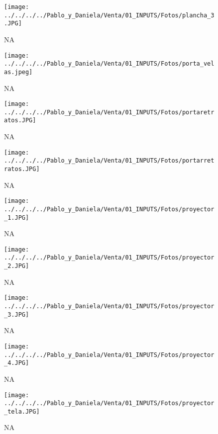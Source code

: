 \documentclass[
]{article}
\begin{document}
\pagebreak

\begin{figure}
\centering
\texttt{[image: ../../../../Pablo\_y\_Daniela/Venta/01\_INPUTS/Fotos/plancha\_3.JPG]}
\caption{NA}
\end{figure}

\pagebreak

\begin{figure}
\centering
\texttt{[image: ../../../../Pablo\_y\_Daniela/Venta/01\_INPUTS/Fotos/porta\_velas.jpeg]}
\caption{NA}
\end{figure}

\pagebreak

\begin{figure}
\centering
\texttt{[image: ../../../../Pablo\_y\_Daniela/Venta/01\_INPUTS/Fotos/portaretratos.JPG]}
\caption{NA}
\end{figure}

\pagebreak

\begin{figure}
\centering
\texttt{[image: ../../../../Pablo\_y\_Daniela/Venta/01\_INPUTS/Fotos/portarretratos.JPG]}
\caption{NA}
\end{figure}

\pagebreak

\begin{figure}
\centering
\texttt{[image: ../../../../Pablo\_y\_Daniela/Venta/01\_INPUTS/Fotos/proyector\_1.JPG]}
\caption{NA}
\end{figure}

\pagebreak

\begin{figure}
\centering
\texttt{[image: ../../../../Pablo\_y\_Daniela/Venta/01\_INPUTS/Fotos/proyector\_2.JPG]}
\caption{NA}
\end{figure}

\pagebreak

\begin{figure}
\centering
\texttt{[image: ../../../../Pablo\_y\_Daniela/Venta/01\_INPUTS/Fotos/proyector\_3.JPG]}
\caption{NA}
\end{figure}

\pagebreak

\begin{figure}
\centering
\texttt{[image: ../../../../Pablo\_y\_Daniela/Venta/01\_INPUTS/Fotos/proyector\_4.JPG]}
\caption{NA}
\end{figure}

\pagebreak

\begin{figure}
\centering
\texttt{[image: ../../../../Pablo\_y\_Daniela/Venta/01\_INPUTS/Fotos/proyector\_tela.JPG]}
\caption{NA}
\end{figure}
\end{document}
